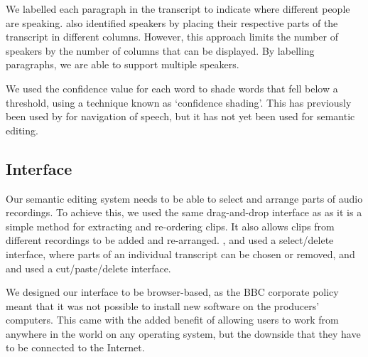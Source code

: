 We labelled each paragraph in the transcript to indicate where different people
are speaking. \citet{Rubin2013} also identified speakers by placing their
respective parts of the transcript in different columns.  However, this
approach limits the number of speakers by the number of columns that can be
displayed. By labelling paragraphs, we are able to support multiple speakers.

We used the confidence value for each word to shade words that fell below a
threshold, using a technique known as `confidence shading'. This has previously
been used by \citet{Burke2006} for navigation of speech, but it has not yet
been used for semantic editing.




\subsection{Interface}
Our semantic editing system needs to be able to select and arrange parts of
audio recordings. To achieve this, we used the same drag-and-drop interface as
\citet{Hyperaudio2016} as it is a simple method for extracting and re-ordering
clips. It also allows clips from different recordings to be added and
re-arranged. \citet{Casares2002}, \citet{Sivaraman2016} and
\citet{Berthouzoz2012} used a select/delete interface, where parts of an
individual transcript can be chosen or removed, and \cite{Whittaker2004} and
\citet{Rubin2013} used a cut/paste/delete interface.

We designed our interface to be browser-based, as the BBC corporate policy
meant that it was not possible to install new software on the producers'
computers. This came with the added benefit of allowing users to work from
anywhere in the world on any operating system, but the downside that they have
to be connected to the Internet.

